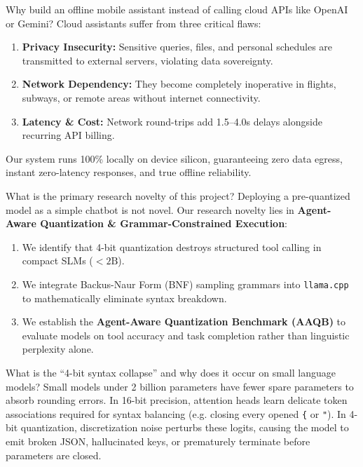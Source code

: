 \documentclass[11pt,a4paper]{article}
\begin{document}
\begin{qabox}{Why build an offline mobile assistant instead of calling cloud APIs like OpenAI or Gemini?}
Cloud assistants suffer from three critical flaws:
\begin{enumerate}[leftmargin=*]
  \item \textbf{Privacy Insecurity:} Sensitive queries, files, and personal schedules are transmitted to external servers, violating data sovereignty.
  \item \textbf{Network Dependency:} They become completely inoperative in flights, subways, or remote areas without internet connectivity.
  \item \textbf{Latency \& Cost:} Network round-trips add 1.5--4.0s delays alongside recurring API billing.
\end{enumerate}
Our system runs 100\% locally on device silicon, guaranteeing zero data egress, instant zero-latency responses, and true offline reliability.
\end{qabox}

\begin{qabox}{What is the primary research novelty of this project?}
Deploying a pre-quantized model as a simple chatbot is not novel. Our research novelty lies in \textbf{Agent-Aware Quantization \& Grammar-Constrained Execution}:
\begin{enumerate}[leftmargin=*]
  \item We identify that 4-bit quantization destroys structured tool calling in compact SLMs ($<2\text{B}$).
  \item We integrate Backus-Naur Form (BNF) sampling grammars into \texttt{llama.cpp} to mathematically eliminate syntax breakdown.
  \item We establish the \textbf{Agent-Aware Quantization Benchmark (AAQB)} to evaluate models on tool accuracy and task completion rather than linguistic perplexity alone.
\end{enumerate}
\end{qabox}

\begin{qabox}{What is the ``4-bit syntax collapse'' and why does it occur on small language models?}
Small models under 2 billion parameters have fewer spare parameters to absorb rounding errors. In 16-bit precision, attention heads learn delicate token associations required for syntax balancing (e.g. closing every opened \texttt{\{} or \texttt{"}). In 4-bit quantization, discretization noise perturbs these logits, causing the model to emit broken JSON, hallucinated keys, or prematurely terminate before parameters are closed.
\end{qabox}
\end{document}

